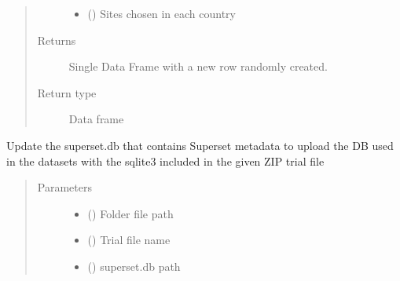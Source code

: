 \documentclass[letterpaper,10pt,english]{sphinxmanual}
\begin{document}
\begin{fulllineitems}
\begin{quote}
\begin{description}
\begin{itemize}
\item {} 
\sphinxAtStartPar
{} () \textendash{} Sites chosen in each country

\end{itemize}

\item[{Returns}] \leavevmode
\sphinxAtStartPar
Single Data Frame with a new row randomly created.

\item[{Return type}] \leavevmode
\sphinxAtStartPar
Data frame

\end{description}\end{quote}

\end{fulllineitems}


\begin{fulllineitems}
\label{\detokenize{CE_app.synth_trial:CE_app.synth_trial.functions.func_nihpo_update_sqlite3_in_superset}}
\sphinxAtStartPar
Update the superset.db that contains Superset metadata to upload the DB used in the datasets
with the sqlite3 included in the given ZIP trial file
\begin{quote}\begin{description}
\item[{Parameters}] \leavevmode\begin{itemize}
\item {} 
\sphinxAtStartPar
{} () \textendash{} Folder file path

\item {} 
\sphinxAtStartPar
{} () \textendash{} Trial file name

\item {} 
\sphinxAtStartPar
{} () \textendash{} superset.db path

\end{itemize}

\end{description}\end{quote}

\end{fulllineitems}
\end{document}
